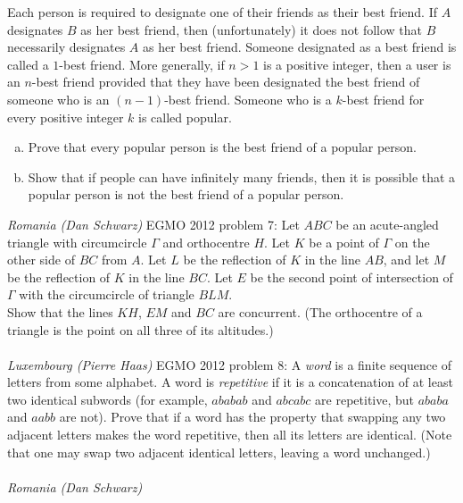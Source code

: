 Each person is required to designate one of their friends as their best friend. If $A$ designates $B$ as her best friend, then (unfortunately) it does not follow that $B$ necessarily designates $A$ as her best friend. Someone designated as a best friend is called a $1$-best friend. More generally, if $n> 1$ is a positive integer, then a user is an $n$-best friend provided that they have been designated the best friend of someone who is an $(n-1)$-best friend. Someone who is a $k$-best friend for every positive integer $k$ is called popular.
\begin{enumerate}[(a)]
  \item Prove that every popular person is the best friend of a popular person.
  \item Show that if people can have infinitely many friends, then it is possible that a popular person is not the best friend of a popular person.
\end{enumerate}
\textit{Romania (Dan Schwarz)} 
EGMO 2012 problem 7:  Let $ABC$ be an acute-angled triangle with circumcircle $\Gamma$ and orthocentre $H$. Let $K$ be a point of $\Gamma$ on the other side of $BC$ from $A$. Let $L$ be the reflection of $K$ in the line $AB$, and let $M$ be the reflection of $K$ in the line $BC$. Let $E$ be the second point of intersection of $\Gamma $ with the circumcircle of triangle $BLM$. \\
Show that the lines $KH$, $EM$ and $BC$ are concurrent. (The orthocentre of a triangle is the point on all three of its altitudes.) \\\\
\textit{Luxembourg (Pierre Haas)} 
EGMO 2012 problem 8:  A \textit{word} is a finite sequence of letters from some alphabet. A word is \textit{repetitive} if it is a concatenation of at least two identical subwords (for example, $ababab$ and $abcabc$ are repetitive, but $ababa$ and $aabb$ are not). Prove that if a word has the property that swapping any two adjacent letters makes the word repetitive, then all its letters are identical. (Note that one may swap two adjacent identical letters, leaving a word unchanged.) \\\\
\textit{Romania (Dan Schwarz)} 
